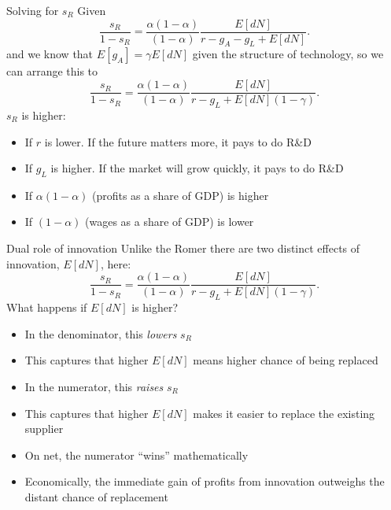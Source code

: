 \begin{frame}{Solving for $s_R$}
Given
\begin{equation}
	\frac{s_R}{1-s_R} = \frac{\alpha(1-\alpha)}{(1-\alpha)}\frac{E[dN]}{r-g_A-g_L+E[dN]}. \nonumber
\end{equation}
and we know that $E[g_A] = \gamma E[dN]$ given the structure of technology, so we can arrange this to
\begin{equation}
	\frac{s_R}{1-s_R} = \frac{\alpha(1-\alpha)}{(1-\alpha)}\frac{E[dN]}{r-g_L+E[dN](1-\gamma)}. \label{EQ_sR_schump}
\end{equation}
$s_R$ is higher:
\begin{itemize}
	\item If $r$ is lower. If the future matters more, it pays to do R\&D
	\item If $g_L$ is higher. If the market will grow quickly, it pays to do R\&D
	\item If $\alpha(1-\alpha)$ (profits as a share of GDP) is higher
	\item If $(1-\alpha)$ (wages as a share of GDP) is lower
\end{itemize}
\end{frame}

\begin{frame}{Dual role of innovation}
Unlike the Romer there are two distinct effects of innovation, $E[dN]$, here:
\begin{equation}
	\frac{s_R}{1-s_R} = \frac{\alpha(1-\alpha)}{(1-\alpha)}\frac{E[dN]}{r-g_L+E[dN](1-\gamma)}. \label{EQ_sR_schump}
\end{equation}
What happens if $E[dN]$ is higher?
\begin{itemize}
	\item In the denominator, this \textit{lowers} $s_R$
	\item This captures that higher $E[dN]$ means higher chance of being replaced
	\item In the numerator, this \textit{raises} $s_R$
	\item This captures that higher $E[dN]$ makes it easier to replace the existing supplier
	\item On net, the numerator ``wins'' mathematically 
	\item Economically, the immediate gain of profits from innovation outweighs the distant chance of replacement
\end{itemize}
\end{frame}

